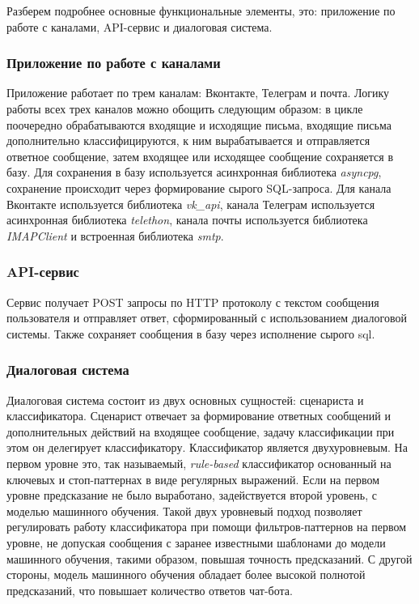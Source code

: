     Разберем подробнее основные функциональные элементы, это:
    приложение по работе с каналами, API-сервис и диалоговая система.
    
    \subsubsection*{Приложение по работе с каналами}
    Приложение работает по трем каналам: Вконтакте, Телеграм и почта. Логику работы всех трех каналов можно обощить
    следующим образом: в цикле поочередно обрабатываются входящие  и исходящие письма, входящие письма дополнительно
    классифицируются, к ним вырабатывается и отправляется ответное сообщение, затем входящее или исходящее сообщение
    сохраняется в базу. Для сохранения в базу используется асинхронная библиотека \textit{asyncpg},
    сохранение происходит через формирование сырого SQL-запроса.
    Для канала Вконтакте используется библиотека \textit{vk\_api},
    канала Телеграм используется асинхронная библиотека \textit{telethon},
    канала почты используется библиотека \textit{IMAPClient} и встроенная библиотека \textit{smtp}.

    \subsubsection*{API-сервис}
    Сервис получает POST запросы по HTTP протоколу с текстом сообщения пользователя и отправляет ответ,
    сформированный с использованием диалоговой системы. Также сохраняет сообщения в базу через исполнение сырого sql.

    \subsubsection*{Диалоговая система}
    Диалоговая система состоит из двух основных сущностей: сценариста и классификатора. Сценарист отвечает за формирование ответных
    сообщений и дополнительных действий на входящее сообщение, задачу классификации при этом он делегирует классификатору.
    Классификатор является двухуровневым. На первом уровне это, так называемый, \textit{rule-based} классификатор
    основанный на ключевых и стоп-паттернах в виде регулярных выражений. Если на первом уровне предсказание не было выработано,
    задействуется второй уровень, с моделью машинного обучения. Такой двух уровневый подход позволяет
    регулировать работу классификатора при помощи фильтров-паттернов на первом уровне, не допуская сообщения с
    заранее известными шаблонами до модели машинного обучения, такими образом, повышая точность предсказаний.
    С другой стороны, модель машинного обучения обладает более высокой полнотой предсказаний, что повышает
    количество ответов чат-бота.

